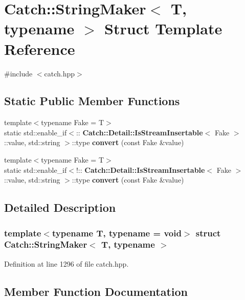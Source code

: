 \section{Catch\+::String\+Maker$<$ T, typename $>$ Struct Template Reference}
\label{struct_catch_1_1_string_maker}


{\ttfamily \#include $<$catch.\+hpp$>$}

\subsection*{Static Public Member Functions}
\begin{DoxyCompactItemize}
\item 
{\footnotesize template$<$typename Fake  = T$>$ }\\static std\+::enable\+\_\+if$<$\+::\textbf{ Catch\+::\+Detail\+::\+Is\+Stream\+Insertable}$<$ Fake $>$\+::value, std\+::string $>$\+::type \textbf{ convert} (const Fake \&value)
\item 
{\footnotesize template$<$typename Fake  = T$>$ }\\static std\+::enable\+\_\+if$<$!\+::\textbf{ Catch\+::\+Detail\+::\+Is\+Stream\+Insertable}$<$ Fake $>$\+::value, std\+::string $>$\+::type \textbf{ convert} (const Fake \&value)
\end{DoxyCompactItemize}


\subsection{Detailed Description}
\subsubsection*{template$<$typename T, typename = void$>$\newline
struct Catch\+::\+String\+Maker$<$ T, typename $>$}



Definition at line 1296 of file catch.\+hpp.



\subsection{Member Function Documentation}
\mbox{\label{struct_catch_1_1_string_maker_ab2c357e22b754802c4b1351257103eb6}} 
